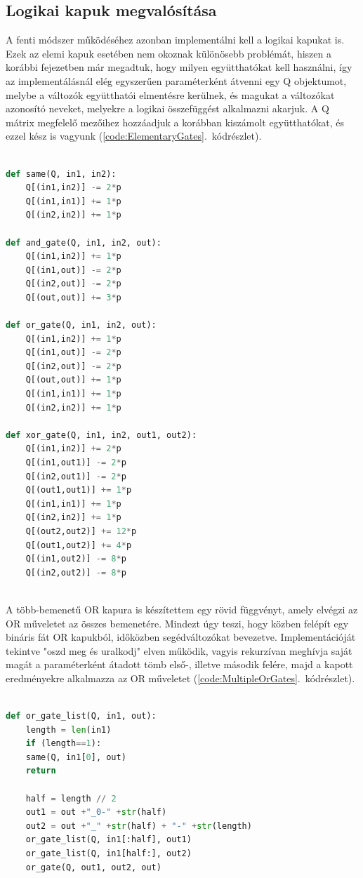 \subsection{Logikai kapuk megvalósítása}

A fenti módszer működéséhez azonban implementálni kell a logikai kapukat is.
Ezek az elemi kapuk esetében nem okoznak különösebb problémát, hiszen a korábbi fejezetben már megadtuk, hogy milyen együtthatókat kell használni, így az implementálásnál elég egyszerűen paraméterként átvenni egy Q objektumot, melybe a változók együtthatói elmentésre kerülnek, és magukat a változókat azonosító neveket, melyekre a logikai összefüggést alkalmazni akarjuk. A Q mátrix megfelelő mezőihez hozzáadjuk a korábban kiszámolt együtthatókat, és ezzel kész is vagyunk (\ref{code:ElementaryGates}.~kódrészlet).

\begin{lstlisting}[language=python,caption=Elemi kapuk,label=code:ElementaryGates]
	
def same(Q, in1, in2):
	Q[(in1,in2)] -= 2*p
	Q[(in1,in1)] += 1*p
	Q[(in2,in2)] += 1*p

def and_gate(Q, in1, in2, out):
	Q[(in1,in2)] += 1*p
	Q[(in1,out)] -= 2*p
	Q[(in2,out)] -= 2*p
	Q[(out,out)] += 3*p

def or_gate(Q, in1, in2, out):
	Q[(in1,in2)] += 1*p
	Q[(in1,out)] -= 2*p
	Q[(in2,out)] -= 2*p
	Q[(out,out)] += 1*p
	Q[(in1,in1)] += 1*p
	Q[(in2,in2)] += 1*p

def xor_gate(Q, in1, in2, out1, out2):
	Q[(in1,in2)] += 2*p
	Q[(in1,out1)] -= 2*p
	Q[(in2,out1)] -= 2*p
	Q[(out1,out1)] += 1*p
	Q[(in1,in1)] += 1*p
	Q[(in2,in2)] += 1*p
	Q[(out2,out2)] += 12*p
	Q[(out1,out2)] += 4*p
	Q[(in1,out2)] -= 8*p
	Q[(in2,out2)] -= 8*p
	
\end{lstlisting}

A több-bemenetű OR kapura is készítettem egy rövid függvényt, amely elvégzi az OR műveletet az összes bemenetére. Mindezt úgy teszi, hogy közben felépít egy bináris fát OR kapukból, időközben segédváltozókat bevezetve. Implementációját tekintve "oszd meg és uralkodj" elven működik, vagyis rekurzívan meghívja saját magát a paraméterként átadott tömb első-, illetve második felére, majd a kapott eredményekre alkalmazza az OR műveletet (\ref{code:MultipleOrGates}.~kódrészlet).

\begin{lstlisting}[language=python,caption=Sokbemenetes OR kapu,label=code:MultipleOrGates]
	
def or_gate_list(Q, in1, out):
	length = len(in1)
	if (length==1):
	same(Q, in1[0], out)
	return
	
	half = length // 2
	out1 = out +"_0-" +str(half)  
	out2 = out +"_" +str(half) + "-" +str(length)
	or_gate_list(Q, in1[:half], out1)
	or_gate_list(Q, in1[half:], out2)
	or_gate(Q, out1, out2, out)
	
\end{lstlisting}

